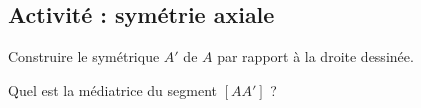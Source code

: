 
\subsection*{Activité : symétrie axiale}

Construire le symétrique \( A'\) de \( A\) par rapport à la droite dessinée.

\begin{center}
   
\end{center}

        Quel est la médiatrice du segment \( [AA']\) ?

